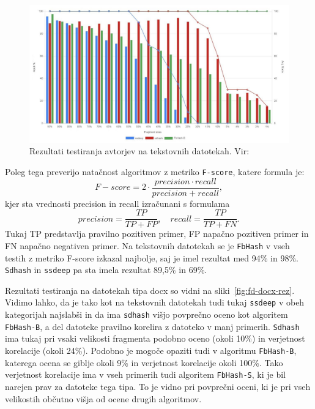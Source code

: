 \documentclass{acm_proc_article-sp}
\begin{document}
\begin{figure}[htb]
\begin{center}
\includegraphics[width=1\columnwidth]{frag_det_text.png}
\end{center}
\caption{\small{Rezultati testiranja avtorjev na tekstovnih datotekah. Vir: \cite{fbhash}}}
\label{fig:fd-rez}
\end{figure}

Poleg tega preverijo natačnost algoritmov z metriko  \texttt{F-score}, katere formula je:
\begin{displaymath} F-score = 2\cdot\frac{precision\cdot recall}{precision + recall},\end{displaymath} 
kjer sta vrednosti precision in recall izračunani s formulama
\begin{displaymath} precision = \frac{TP}{TP + FP},\quad recall = \frac{TP}{TP+FN}.\end{displaymath} 
Tukaj TP predstavlja pravilno pozitiven primer, FP napačno pozitiven primer in FN napačno negativen primer. Na tekstovnih datotekah se je \texttt{FbHash} v vseh testih z metriko F-score izkazal najbolje, saj je imel rezultat med 94\% in 98\%. \texttt{Sdhash} in \texttt{ssdeep} pa sta imela rezultat 89,5\% in 69\%.

Rezultati testiranja na datotekah tipa docx so vidni na sliki~\ref{fig:fd-docx-rez}. Vidimo lahko, da je tako kot na tekstovnih datotekah tudi tukaj \texttt{ssdeep} v obeh kategorijah najslabši in da ima  \texttt{sdhash} višjo povprečno oceno kot algoritem \texttt{FbHash-B}, a del datoteke pravilno korelira z datoteko v manj primerih. \texttt{Sdhash} ima tukaj pri vsaki velikosti fragmenta podobno oceno (okoli 10\%) in verjetnost korelacije (okoli 24\%). Podobno je mogoče opaziti tudi v algoritmu \texttt{FbHash-B}, katerega ocena se giblje okoli 9\% in verjetnost korelacije okoli 100\%. Tako verjetnost korelacije ima v vseh primerih tudi algoritem \texttt{FbHash-S}, ki je bil narejen prav za datoteke tega tipa. To je vidno pri povprečni oceni, ki je pri vseh velikostih občutno višja od ocene drugih algoritmov.
\end{document}
